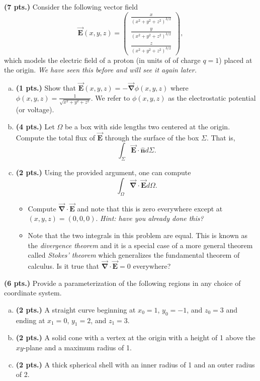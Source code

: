 \documentclass[12pt]{article} %
\newcommand{\grad}{\boldsymbol{\vec{\nabla}}}
\newcommand{\vecfieldE}{\boldsymbol{\vec{E}}}
\newcommand{\unitvec}{\boldsymbol{\hat{n}}}
\begin{document}
\begin{problem}
\textbf{(7 pts.)} Consider the following vector field
\[
\vecfieldE(x,y,z) = \begin{pmatrix} \frac{x}{(x^2+y^2+z^2)^{3/2}} \\ \frac{y}{(x^2+y^2+z^2)^{3/2}} \\ \frac{z}{(x^2+y^2+z^2)^{3/2}} \end{pmatrix},
\]
which models the electric field of a proton (in units of of charge $q=1$) placed at the origin. \emph{We have seen this before and will see it again later.}
\begin{enumerate}[(a)]
	\item \textbf{(1 pts.)} Show that $\vecfieldE(x,y,z) = - \grad \phi(x,y,z)$ where $\phi(x,y,z) = \frac{1}{\sqrt{x^2+y^2+z^2}}$.  We refer to $\phi(x,y,z)$ as the electrostatic potential (or voltage).
	\item \textbf{(4 pts.)} Let $\Omega$ be a box with side lengths two centered at the origin.  Compute the total flux of $\vecfieldE$ through the surface of the box $\Sigma$. That is,
	\[
	\int_\Sigma \vecfieldE \cdot \unitvec d\Sigma.
	\]
	\item \textbf{(2 pts.)} Using the provided argument, one can compute
	\[
	\int_\Omega \grad \cdot \vecfieldE d\Omega.
	\]
	\begin{itemize}
		\item Compute $\grad \cdot \vecfieldE$ and note that this is zero everywhere except at $(x,y,z)=(0,0,0)$. \emph{Hint: have you already done this?}
		\item Note that the two integrals in this problem are equal. This is known as the \emph{divergence theorem} and it is a special case of a more general theorem called \emph{Stokes' theorem} which generalizes the fundamental theorem of calculus. Is it true that $\grad \cdot \vecfieldE = 0$ everywhere?
	\end{itemize}
\end{enumerate}
\end{problem}

\vspace*{0.5cm}

\begin{problem}
	\textbf{(6 pts.)} Provide a parameterization of the following regions in any choice of coordinate system.
	\begin{enumerate}[(a)]
		\item \textbf{(2 pts.)} A straight curve beginning at $x_0=1$, $y_0=-1$, and $z_0=3$ and ending at $x_1 = 0$, $y_1=2$, and $z_1=3$.
		\item \textbf{(2 pts.)} A solid cone with a vertex at the origin with a height of 1 above the $xy$-plane and a maximum radius of 1.
		\item \textbf{(2 pts.)} A thick spherical shell with an inner radius of 1 and an outer radius of 2.
	\end{enumerate}
\end{problem}
\end{document}
